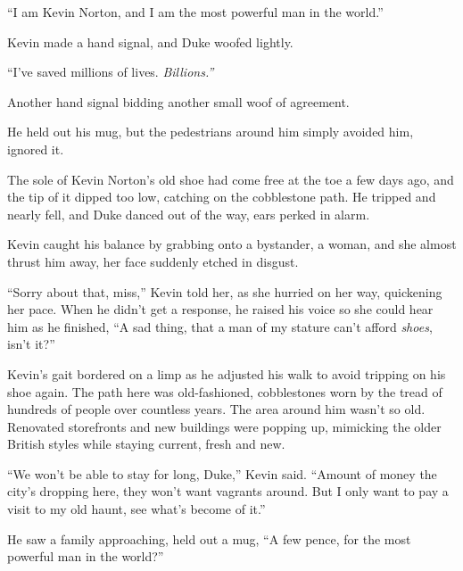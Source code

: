 





``I am Kevin Norton, and I am the most powerful man in the world.''



Kevin made a hand signal, and Duke woofed lightly.



``I've saved millions of lives.  \emph{Billions.''}



Another hand signal bidding another small woof of agreement.



He held out his mug, but the pedestrians around him simply avoided him, ignored it.



The sole of Kevin Norton's old shoe had come free at the toe a few days ago, and the tip of it dipped too low, catching on the cobblestone path. He tripped and nearly fell, and Duke danced out of the way, ears perked in alarm.



Kevin caught his balance by grabbing onto a bystander, a woman, and she almost thrust him away, her face suddenly etched in disgust.



``Sorry about that, miss,'' Kevin told her, as she hurried on her way, quickening her pace.  When he didn't get a response, he raised his voice so she could hear him as he finished, ``A sad thing, that a man of my stature can't afford \emph{shoes}, isn't it?''



Kevin's gait bordered on a limp as he adjusted his walk to avoid tripping on his shoe again.  The path here was old-fashioned, cobblestones worn by the tread of hundreds of people over countless years.  The area around him wasn't so old.  Renovated storefronts and new buildings were popping up, mimicking the older British styles while staying current, fresh and new.



``We won't be able to stay for long, Duke,'' Kevin said.  ``Amount of money the city's dropping here, they won't want vagrants around.  But I only want to pay a visit to my old haunt, see what's become of it.''



He saw a family approaching, held out a mug, ``A few pence, for the most powerful man in the world?''



